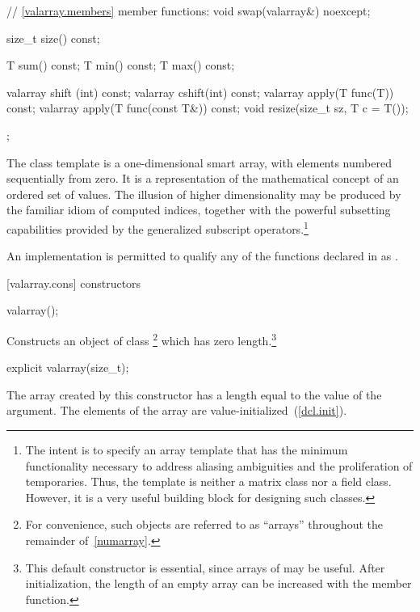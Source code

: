 \begin{codeblock}
{{    // \ref{valarray.members} member functions:
    void swap(valarray&) noexcept;

    size_t size() const;

    T sum() const;
    T min() const;
    T max() const;

    valarray shift (int) const;
    valarray cshift(int) const;
    valarray apply(T func(T)) const;
    valarray apply(T func(const T&)) const;
    void resize(size_t sz, T c = T());
  };
}
\end{codeblock}

\pnum
The
class template
is a
one-dimensional smart array, with elements numbered sequentially from zero.
It is a representation of the mathematical concept
of an ordered set of values.
The illusion of higher dimensionality
may be produced by the familiar idiom of computed indices, together
with the powerful subsetting capabilities provided
by the generalized subscript operators.\footnote{The intent is to specify
an array template that has the minimum functionality
necessary to address aliasing ambiguities and the proliferation of
temporaries.
Thus, the
template is neither a
matrix class nor a field class.
However, it is a very useful building block for designing such classes.}

\pnum
An implementation is permitted to qualify any of the functions declared in
as
.

[valarray.cons]{ constructors}

%
\begin{itemdecl}
valarray();
\end{itemdecl}

\begin{itemdescr}
\pnum
\effects
Constructs an object of class
\footnote{For convenience, such objects are referred
to as ``arrays'' throughout the
remainder of~\ref{numarray}.}
which has zero length.\footnote{This default constructor is essential,
since arrays of
may be useful.
After initialization, the length of an empty array can be increased with the
member function.}
\end{itemdescr}

%
\begin{itemdecl}
explicit valarray(size_t);
\end{itemdecl}

\begin{itemdescr}
\pnum
The array created by this constructor has a length equal to the value of the argument.
The elements of the array are value-initialized~(\ref{dcl.init}).
\end{itemdescr}

